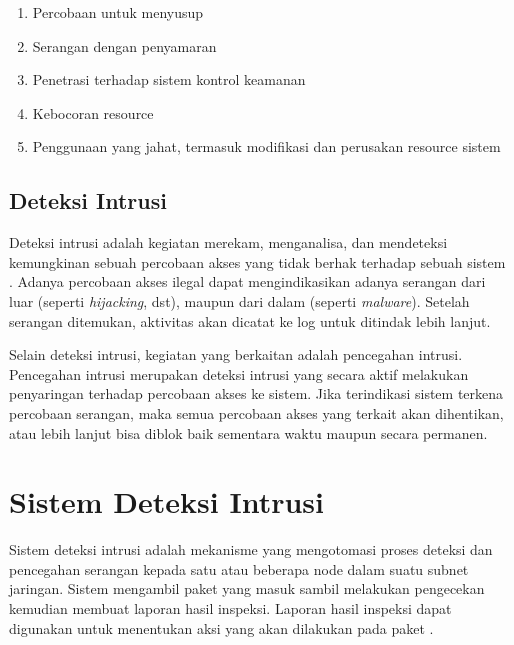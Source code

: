     \begin{enumerate}
      \item Percobaan untuk menyusup
      \item Serangan dengan penyamaran
      \item Penetrasi terhadap sistem kontrol keamanan
      \item Kebocoran resource
      \item Penggunaan yang jahat, termasuk modifikasi dan perusakan resource sistem
    \end{enumerate}



  \subsection{Deteksi Intrusi}

    Deteksi intrusi adalah kegiatan merekam, menganalisa, dan mendeteksi kemungkinan sebuah percobaan akses yang tidak berhak terhadap sebuah sistem \parencite{kizza2015}. Adanya percobaan akses ilegal dapat mengindikasikan adanya serangan dari luar (seperti \emph{hijacking}, dst), maupun dari dalam (seperti \emph{malware}). Setelah serangan ditemukan, aktivitas akan dicatat ke log untuk ditindak lebih lanjut.

    Selain deteksi intrusi, kegiatan yang berkaitan adalah pencegahan intrusi. Pencegahan intrusi merupakan deteksi intrusi yang secara aktif melakukan penyaringan terhadap percobaan akses ke sistem. Jika terindikasi sistem terkena percobaan serangan, maka semua percobaan akses yang terkait akan dihentikan, atau lebih lanjut bisa diblok baik sementara waktu maupun secara permanen.

\section{Sistem Deteksi Intrusi}

  Sistem deteksi intrusi adalah mekanisme yang mengotomasi proses deteksi dan pencegahan serangan kepada satu atau beberapa node dalam suatu subnet jaringan. Sistem mengambil paket yang masuk sambil melakukan pengecekan kemudian membuat laporan hasil inspeksi. Laporan hasil inspeksi dapat digunakan untuk menentukan aksi yang akan dilakukan pada paket \parencite{nist2014}.

